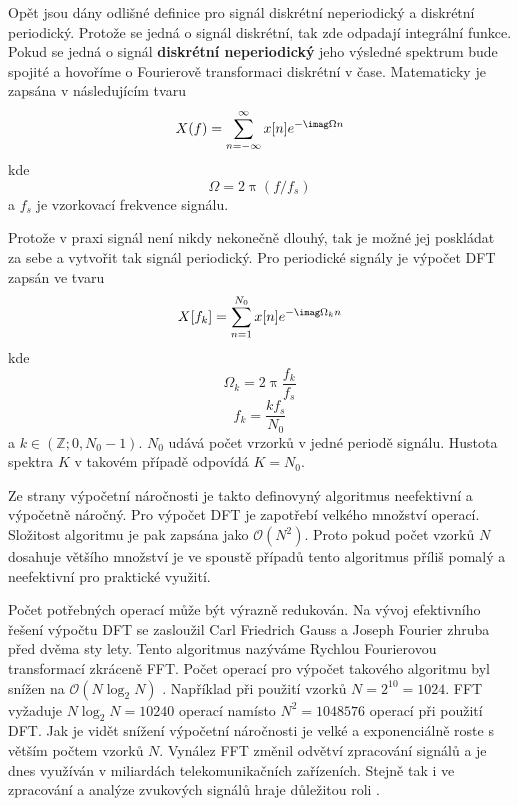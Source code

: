   Opět jsou dány odlišné definice pro signál diskrétní neperiodický a diskrétní periodický. Protože se jedná o signál diskrétní, tak zde odpadají integrální funkce.
  Pokud se jedná o signál \textbf{diskrétní neperiodický} jeho výsledné spektrum bude spojité a hovoříme o Fourierově transformaci diskrétní v čase. Matematicky je zapsána v následujícím tvaru
  \begin{equation}
    X(f) = \sum_{n = -\infty}^{\infty} x[n] e^{-\imag \Omega n}
    \label{rov:DTFT}
  \end{equation}
  kde
  \begin{equation}
    \Omega = 2 \uppi (f/f_s)
  \end{equation}
  a $f_s$ je vzorkovací frekvence signálu.

  Protože v praxi signál není nikdy nekonečně dlouhý, tak je možné jej poskládat za sebe a vytvořit tak signál periodický. Pro periodické signály je výpočet \acs{DFT} zapsán ve tvaru
  \begin{equation}
    X[f_k] = \sum_{n = 1}^{N_0} x[n] e^{-\imag\Omega_k n}
    \label{rov:DFT}
  \end{equation}
  kde
  \begin{equation}
    \Omega_k = 2 \uppi \frac{f_k}{f_s}
  \end{equation}
  \begin{equation}
    f_k = \frac{k f_s}{N_0}
  \end{equation}
  a $k \in(\mathbb{Z}; 0, N_0 -1)$. $N_0$ udává počet vrzorků v jedné periodě signálu.
  Hustota spektra $K$ v takovém případě odpovídá $K = N_0$.

  Ze strany výpočetní náročnosti je takto definovyný algoritmus neefektivní a výpočetně náročný.
  Pro výpočet \acs{DFT} je zapotřebí velkého množství operací. Složitost algoritmu je pak zapsána jako $\mathcal{O}(N^2)$.
  Proto pokud počet vzorků $N$ dosahuje většího množství je ve spoustě případů tento algoritmus příliš pomalý a neefektivní pro praktické využití.

  Počet potřebných operací může být výrazně redukován. 
  Na vývoj efektivního řešení výpočtu \acs{DFT} se zasloužil Carl Friedrich Gauss a Joseph Fourier zhruba před dvěma sty lety. Tento algoritmus nazýváme Rychlou Fourierovou transformací zkráceně FFT.
  Počet operací pro výpočet takového algoritmu byl snížen na $\mathcal{O}(N \log_2 N)$ \cite{fundamental_of_music_processing}.
  Například při použití vzorků $N = 2^{10} = 1024$. \acs{FFT} vyžaduje $N\log_2N = 10240 $ operací namísto $N^2 = 1048576$ operací při použití \acs{DFT}. Jak je vidět snížení výpočetní náročnosti je velké a exponenciálně roste s větším počtem vzorků $N$.
  Vynález \acs{FFT} změnil odvětví zpracování signálů a je dnes využíván v miliardách telekomunikačních zařízeních. Stejně tak i ve zpracování a analýze zvukových signálů hraje důležitou roli \cite{fundamental_of_music_processing}.

